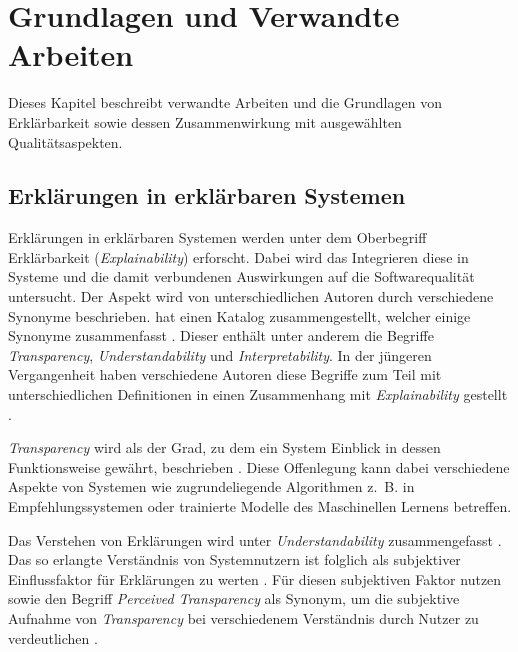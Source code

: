 \chapter{Grundlagen und Verwandte Arbeiten}

Dieses Kapitel beschreibt verwandte Arbeiten und die Grundlagen von Erklärbarkeit sowie dessen Zusammenwirkung mit ausgewählten Qualitätsaspekten.

\section{Erklärungen in erklärbaren Systemen}
\label{02_basics:explainable_system}

Erklärungen in erklärbaren Systemen werden unter dem Oberbegriff Erklärbarkeit (\textit{Explainability}) erforscht. Dabei wird das Integrieren diese in Systeme und die damit verbundenen Auswirkungen auf die Softwarequalität untersucht. Der Aspekt wird von unterschiedlichen Autoren durch verschiedene Synonyme beschrieben. \citeauthor{brennen_what_2020} hat einen Katalog zusammengestellt, welcher einige Synonyme zusammenfasst \cite{brennen_what_2020}. Dieser enthält unter anderem die Begriffe
\textit{Transparency}, \textit{Understandability} und \textit{Interpretability}. In der jüngeren Vergangenheit haben verschiedene Autoren diese Begriffe zum Teil mit unterschiedlichen Definitionen in einen Zusammenhang mit \textit{Explainability} gestellt \cite{chazette_end-users_nodate,chazette_knowledge_nodate,kohl_explainability_2019,wang_integration_2020}.

\textit{Transparency} wird als der Grad, zu dem ein System Einblick in dessen Funktionsweise gewährt, beschrieben \cite{chazette_end-users_nodate}. Diese Offenlegung kann dabei verschiedene Aspekte von Systemen wie zugrundeliegende Algorithmen z.~B. in Empfehlungssystemen \cite{balog_measuring_2020} oder trainierte Modelle des Maschinellen Lernens \cite{sovrano_modelling_2020} betreffen.

Das Verstehen von Erklärungen wird unter \textit{Understandability} zusammengefasst \cite{do2010software}. Das so erlangte Verständnis von Systemnutzern ist folglich als subjektiver Einflussfaktor für Erklärungen zu werten \cite{chazette_end-users_nodate}. Für diesen subjektiven Faktor nutzen \citeauthor{wang_integration_2020} sowie \citeauthor{balog_measuring_2020} den Begriff \textit{Perceived Transparency} als Synonym, um die subjektive Aufnahme von \textit{Transparency} bei verschiedenem Verständnis durch Nutzer zu verdeutlichen \cite{wang_integration_2020, balog_measuring_2020}.

